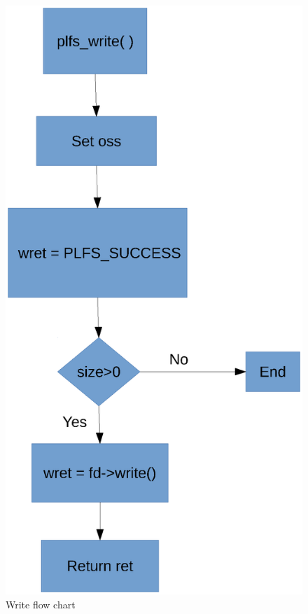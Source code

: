 \documentclass[conference]{IEEEtran}
\begin{document}
\begin{figure}
	\centerline{
		\includegraphics[scale=0.8]{write.eps}}
	\caption{Write flow chart}
\end{figure}
\end{document}

